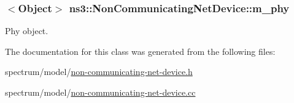 \subsubsection[{\texorpdfstring{m\+\_\+phy}{m_phy}}]{$<${\bf Object}$>$ ns3\+::\+Non\+Communicating\+Net\+Device\+::m\+\_\+phy\hspace{0.3cm}{\ttfamily [private]}}\hypertarget{classns3_1_1NonCommunicatingNetDevice_a938941e476d9d2fef73d97e7db1456b9}{}\label{classns3_1_1NonCommunicatingNetDevice_a938941e476d9d2fef73d97e7db1456b9}


Phy object. 



The documentation for this class was generated from the following files\+:\begin{DoxyCompactItemize}
\item 
spectrum/model/\hyperlink{non-communicating-net-device_8h}{non-\/communicating-\/net-\/device.\+h}\item 
spectrum/model/\hyperlink{non-communicating-net-device_8cc}{non-\/communicating-\/net-\/device.\+cc}\end{DoxyCompactItemize}
